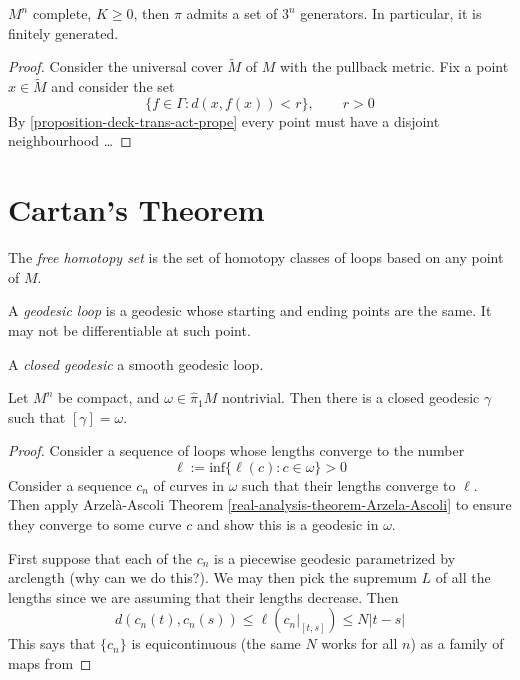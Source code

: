 \begin{theorem}[Gromov]
\label{theorem-Gromov}
$M^n$ complete, $K \geq 0$, then $\pi$ admits
a set of $3^n$ generators. In
particular, it is finitely generated.
\end{theorem}

\begin{proof}
Consider the universal cover $\tilde{M}$ of
$M$ with the pullback metric. Fix a
point $x \in \tilde{M}$ and consider the set
$$
\{f \in \Gamma:d(x,f(x))<r\},\qquad r>0
$$
By \ref{proposition-deck-trans-act-prope}
every point must have a disjoint
neighbourhood …
\end{proof}

\section{Cartan's Theorem}
\label{section-Cartan-theorem}

\begin{definition}
\label{definition-free-homotopy-set}
The {\it free homotopy set} is the set of
homotopy classes of loops based on any
point of $M$.
\end{definition}

\begin{definition}
\label{definition-geodesic-loop}
A {\it geodesic loop} is a geodesic whose
starting and ending points are the
same. It may not be differentiable at such
point.
\end{definition}

\begin{definition}
\label{definition-closed-geodesic}
A {\it closed geodesic} a smooth geodesic
loop.
\end{definition}

\begin{theorem}[Cartan]
\label{theorem-Cartan}
Let $M^n$ be compact, and $\omega \in
\hat{\pi}_1M$ nontrivial. Then there is a
closed geodesic $\gamma$ such that
$[\gamma]=\omega$.
\end{theorem}

\begin{proof}
Consider a sequence of loops whose lengths
converge to the number
$$
\ell:=\text{inf}\{\ell(c):c \in \omega\}>0
$$
Consider a sequence $c_n$ of curves in
$\omega$ such that their lengths converge
to $\ell$. Then apply Arzelà-Ascoli Theorem
\ref{real-analysis-theorem-Arzela-Ascoli}
 to ensure they converge to some curve $c$
 and show this is a geodesic
in $\omega$.

First suppose that each of the $c_n$ is a
piecewise geodesic parametrized by
arclength (why can we do this?). We may then
pick the supremum $L$ of all the
lengths since we are assuming that their
lengths decrease. Then
$$
d(c_n(t),c_n(s)) \leq \ell
\left(c_n|_{[t,s]}\right) \leq  N |t-s|
$$
This says that $\{c_n\}$ is equicontinuous
(the same $N$ works for all $n$) as a
family of maps from
\end{proof}

